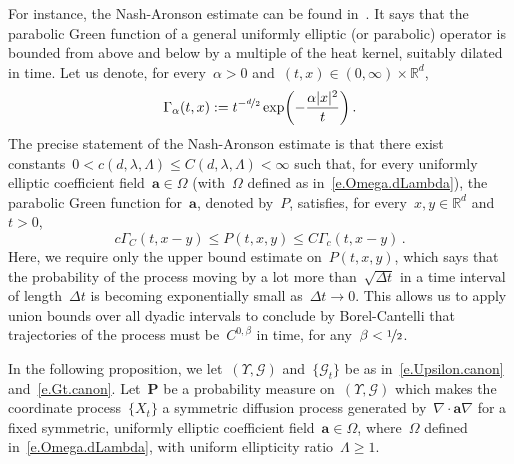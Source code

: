 \documentclass[11pt,twoside]{article} %
\numberwithin{equation}{section}
\theoremstyle{definition}
\newcommand*{\Rd}{\ensuremath{\mathbb{R}^d}}
\renewcommand{\a}{\mathbf{a}}
\begin{document}
For instance, the Nash-Aronson estimate can be found in~\cite[Lemma E.8]{AKMBook}. It says that the parabolic Green function of a general uniformly elliptic (or parabolic) operator is bounded from above and below by a multiple of the heat kernel, suitably dilated in time. 
Let us denote, for every~$\alpha>0$ and~$(t,x) \in (0,\infty) \times \Rd$,  
\begin{equation}
\label{e.heatkernel}
\Gamma_\alpha (t,x) := t^{-\nicefrac d2} \exp\biggl( -\frac{\alpha |x|^2}{t} \biggr)\,.
\end{equation}
The precise statement of the Nash-Aronson estimate is that there exist constants~$0<c(d,\lambda,\Lambda)\leq C(d,\lambda,\Lambda)<\infty$ such that, for every uniformly elliptic coefficient field~$\a \in \Omega$ (with~$\Omega$ defined as in~\eqref{e.Omega.dLambda}),
the parabolic Green function for~$\a$, denoted by~$P$, satisfies, for every~$x,y\in\Rd$ and~$t>0$, 
\begin{equation}
\label{e.Nash.Aronson}
c \Gamma_{C}(t,x-y) 
\leq
P(t,x,y) 
\leq 
C\Gamma_{c} (t,x-y)
\,.
\end{equation}
Here, we require only the upper bound estimate on~$P(t,x,y)$, which says that the probability of the process moving by a lot more than~$\sqrt{\Delta t}$ in a time interval of length~$\Delta t$ is becoming exponentially small as~$\Delta t \to 0$. This allows us to apply union bounds over all dyadic intervals to conclude by Borel-Cantelli that trajectories of the process must be~$C^{0,\beta}$ in time, for any~$\beta < \nicefrac12$. 

\smallskip

In the following proposition, we let~$(\Upsilon,\mathcal{G})$  and~$\{ \mathcal{G}_t \}$ be as in~\eqref{e.Upsilon.canon} and~\eqref{e.Gt.canon}.
Let~$\mathbf{P}$ be a probability measure on~$(\Upsilon,\mathcal{G})$ which makes the coordinate process~$\{ X_t\}$ a symmetric diffusion process generated by~$\nabla \cdot \a\nabla$ for a fixed symmetric, uniformly elliptic coefficient field~$\a\in\Omega$, where~$\Omega$ defined in~\eqref{e.Omega.dLambda}, with uniform ellipticity ratio~$\Lambda\geq1$.
\end{document}

